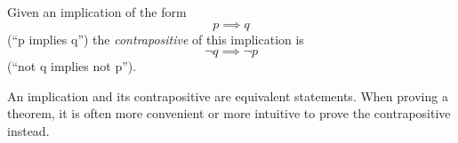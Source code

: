 \documentclass[12pt]{article}
\begin{document}
Given an implication of the form
$$p \implies q$$
(``p implies q'') the \emph{contrapositive} of this implication is
$$\neg q \implies \neg p$$
(``not q implies not p'').

An implication and its contrapositive are equivalent statements.  When proving a theorem, it is often more convenient or more intuitive to prove the contrapositive instead.
\end{document}
